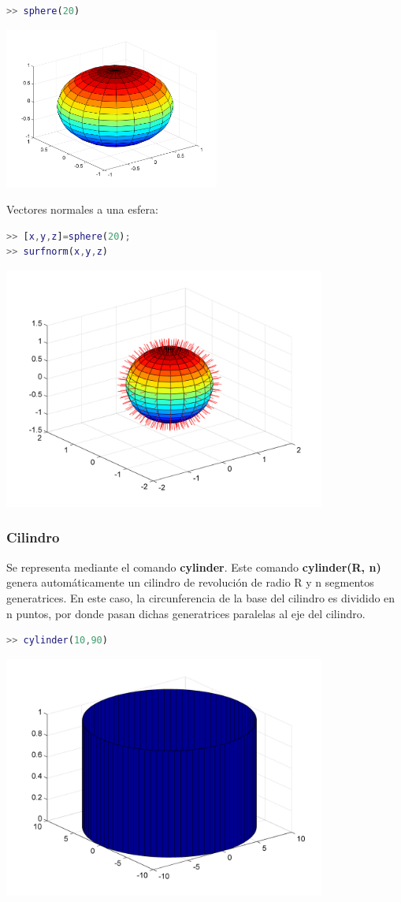 \begin{lstlisting}[language=Matlab]
>> sphere(20)
\end{lstlisting}
\includegraphics[width=200pt]{./Imagenes/esfera1.png}

Vectores normales a una esfera:
\begin{lstlisting}[language=Matlab]
>> [x,y,z]=sphere(20); 
>> surfnorm(x,y,z)
\end{lstlisting}
\includegraphics[width=300pt]{./Imagenes/esfera2.png}

\subsubsection{Cilindro}

Se representa mediante el comando \textbf{cylinder}. Este comando \textbf{cylinder(R, n)} genera automáticamente un cilindro de revolución de radio R y n segmentos generatrices. En este caso, la circunferencia de la base del cilindro es dividido en n puntos, por donde pasan dichas generatrices paralelas al eje del cilindro.
\begin{lstlisting}[language=Matlab]
>> cylinder(10,90)
\end{lstlisting}
\includegraphics[width=300pt]{./Imagenes/cilindro.png}


